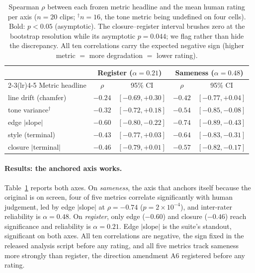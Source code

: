 \documentclass[11pt]{article}
\begin{document}
\begin{table}[t]
\centering
\small
\begin{tabular}{lcccc}
\toprule
& \multicolumn{2}{c}{Register ($\alpha = 0.21$)}
& \multicolumn{2}{c}{Sameness ($\alpha = 0.48$)} \\
\cmidrule(lr){2-3}\cmidrule(lr){4-5}
Metric headline & $\rho$ & 95\% CI & $\rho$ & 95\% CI \\
\midrule
line drift (chamfer)   & $-0.24$ & $[-0.69,+0.30]$ & $-0.42$ & $[-0.77,+0.04]$ \\
tone variance$^{\dagger}$ & $-0.32$ & $[-0.72,+0.18]$ & $\mathbf{-0.54}$ & $[-0.85,-0.08]$ \\
edge $|$slope$|$       & $\mathbf{-0.60}$ & $[-0.80,-0.22]$ & $\mathbf{-0.74}$ & $[-0.89,-0.43]$ \\
style (terminal)       & $-0.43$ & $[-0.77,+0.03]$ & $\mathbf{-0.64}$ & $[-0.83,-0.31]$ \\
closure $|$terminal$|$ & $\mathbf{-0.46}$ & $[-0.79,+0.01]$ & $\mathbf{-0.57}$ & $[-0.82,-0.17]$ \\
\bottomrule
\end{tabular}
\caption{Spearman $\rho$ between each frozen metric headline and the mean
human rating per axis ($n = 20$ clips; $^{\dagger}n = 16$, the tone metric
being undefined on four cells). Bold: $p < 0.05$ (asymptotic). The closure--register
interval brushes zero at the bootstrap resolution while its asymptotic
$p = 0.044$; we flag rather than hide the discrepancy. All ten correlations
carry the expected negative sign (higher metric $=$ more degradation
$=$ lower rating).}
\label{tab:human}
\end{table}

\paragraph{Results: the anchored axis works.} Table~\ref{tab:human} reports
both axes. On \emph{sameness}, the axis that anchors itself because the original
is on screen, four of five metrics correlate significantly with human
judgement, led by edge $|$slope$|$ at $\rho = -0.74$
($p = 2\times10^{-4}$), and inter-rater reliability is $\alpha = 0.48$. On
\emph{register}, only edge ($-0.60$) and closure ($-0.46$) reach
significance and reliability is $\alpha = 0.21$. Edge $|$slope$|$ is the
suite's standout, significant on both axes. All ten correlations are
negative, the sign fixed in the released analysis script before any rating,
and all five metrics track sameness more strongly than register, the
direction amendment A6 registered before any rating.
\end{document}
